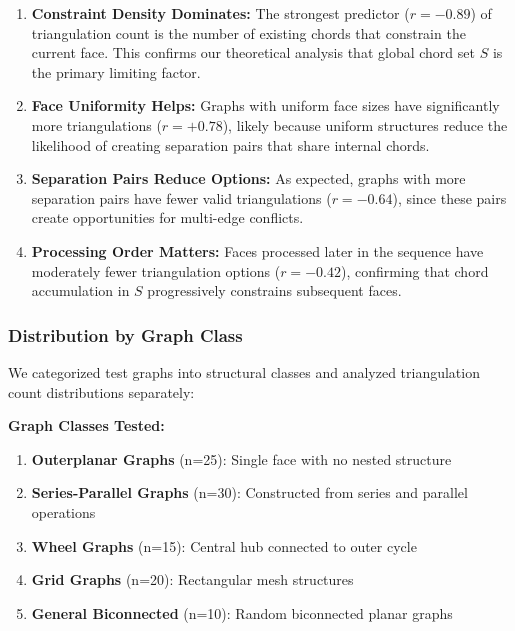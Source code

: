 \documentclass[12pt,a4paper]{article}
\theoremstyle{definition}
\theoremstyle{remark}
\begin{document}
\begin{enumerate}
    \item \textbf{Constraint Density Dominates:} The strongest predictor ($r = -0.89$) of triangulation count is the number of existing chords that constrain the current face. This confirms our theoretical analysis that global chord set $S$ is the primary limiting factor.
    
    \item \textbf{Face Uniformity Helps:} Graphs with uniform face sizes have significantly more triangulations ($r = +0.78$), likely because uniform structures reduce the likelihood of creating separation pairs that share internal chords.
    
    \item \textbf{Separation Pairs Reduce Options:} As expected, graphs with more separation pairs have fewer valid triangulations ($r = -0.64$), since these pairs create opportunities for multi-edge conflicts.
    
    \item \textbf{Processing Order Matters:} Faces processed later in the sequence have moderately fewer triangulation options ($r = -0.42$), confirming that chord accumulation in $S$ progressively constrains subsequent faces.
\end{enumerate}

\subsubsection{Distribution by Graph Class}

We categorized test graphs into structural classes and analyzed triangulation count distributions separately:

\textbf{Graph Classes Tested:}

\begin{enumerate}
    \item \textbf{Outerplanar Graphs} (n=25): Single face with no nested structure
    \item \textbf{Series-Parallel Graphs} (n=30): Constructed from series and parallel operations
    \item \textbf{Wheel Graphs} (n=15): Central hub connected to outer cycle
    \item \textbf{Grid Graphs} (n=20): Rectangular mesh structures
    \item \textbf{General Biconnected} (n=10): Random biconnected planar graphs
\end{enumerate}
\end{document}
